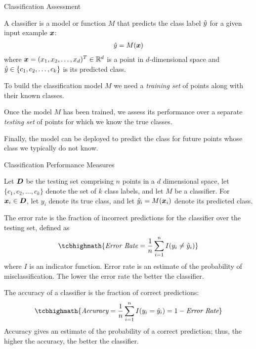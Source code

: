 
\date{Chapter 22: Classification Assessment}
\newcommand{\specificity}{\textit{specif\/{i}city}}

\begin{frame}
\titlepage
\end{frame}



\begin{frame}{Classif\/{i}cation Assessment}

A classif\/{i}er is a model or
function $M$ that predicts the class label $\hat{y}$ for a given input
example ${\boldsymbol x}$:
\begin{align*}
  \hat{y} = M({\boldsymbol x})
\end{align*}
where ${\boldsymbol x} = (x_1, x_2, \ldots, x_d)^T \in {\mathord{\mathbb R}}^d$ is a point in
$d$-dimensional space and $\hat{y} \in \{c_1, c_2, \ldots, c_k\}$ is
its predicted class.

\medskip
To build the classif\/{i}cation model $M$ we need a {\em training set} of
points along with their known classes. 

\medskip
Once the model $M$ has been trained,
we assess its performance over a
separate {\em testing set} of points for which we know the
true classes. 

\medskip
F{i}nally, the model
can be deployed to predict the class for future points whose class we
typically do not know.
\end{frame}



\begin{frame}{Classif\/{i}cation Performance Measures}

Let ${\boldsymbol D}$ be the testing set comprising $n$ points in a $d$
dimensional space, let $\{c_1, c_2, \ldots, c_k\}$ denote the set
of $k$ class labels, and let $M$ be a classif\/{i}er. For ${\boldsymbol x}_i \in
{\boldsymbol D}$, let $y_i$ denote its true class, and let $\hat{y}_i = M({\boldsymbol x}_i)$
denote its predicted class.

The error rate is the fraction
of incorrect predictions for the classif\/{i}er over the testing set,
def\/{i}ned as
\begin{align*}
\tcbhighmath{
  \textit{Error\ Rate} = {1 \over n} \sum_{i=1}^n I(y_i \ne \hy_i)
}
\end{align*}
where $I$ is an indicator function.
Error rate is an estimate of the probability of misclassif\/{i}cation.
The lower the error rate the better the classif\/{i}er.

The accuracy of a classif\/{i}er is
the fraction of correct predictions:
\begin{align*}
\tcbhighmath{
  \textit{Accuracy} ={1\over n} \sum_{i=1}^n I(y_i = \hy_i)  = 1 - \textit{Error\ Rate}
}
\end{align*}
Accuracy gives an estimate of the probability of a correct
prediction; thus, the higher the accuracy, the better the
classif\/{i}er.
\end{frame}



